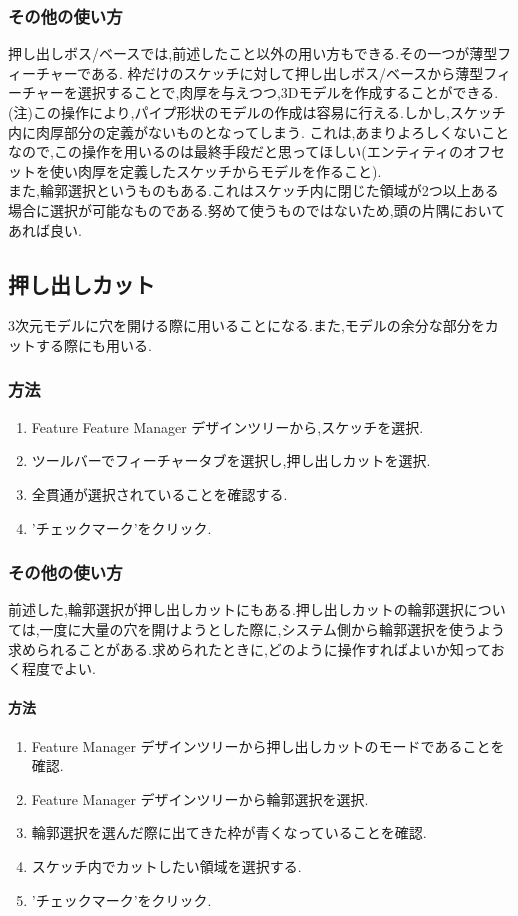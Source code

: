 \documentclass[a4paper,11pt]{jsarticle}
\begin{document}
\subsubsection{その他の使い方}
押し出しボス/ベースでは,前述したこと以外の用い方もできる.その一つが薄型フィーチャーである.
枠だけのスケッチに対して押し出しボス/ベースから薄型フィーチャーを選択することで,肉厚を与えつつ,3Dモデルを作成することができる.\\
(注)この操作により,パイプ形状のモデルの作成は容易に行える.しかし,スケッチ内に肉厚部分の定義がないものとなってしまう.
これは,あまりよろしくないことなので,この操作を用いるのは最終手段だと思ってほしい(エンティティのオフセットを使い肉厚を定義したスケッチからモデルを作ること).\\
また,輪郭選択というものもある.これはスケッチ内に閉じた領域が2つ以上ある場合に選択が可能なものである.努めて使うものではないため,頭の片隅においてあれば良い.
\subsection{押し出しカット}
3次元モデルに穴を開ける際に用いることになる.また,モデルの余分な部分をカットする際にも用いる.
\subsubsection{方法}
\begin{enumerate}
 \item Feature Feature Manager デザインツリーから,スケッチを選択.
 \item ツールバーでフィーチャータブを選択し,押し出しカットを選択.
 \item 全貫通が選択されていることを確認する.
 \item 'チェックマーク'をクリック.
\end{enumerate}
\subsubsection{その他の使い方}
前述した,輪郭選択が押し出しカットにもある.押し出しカットの輪郭選択については,一度に大量の穴を開けようとした際に,システム側から輪郭選択を使うよう求められることがある.求められたときに,どのように操作すればよいか知っておく程度でよい.
\paragraph{方法}
\begin{enumerate}
 \item Feature Manager デザインツリーから押し出しカットのモードであることを確認.
 \item Feature Manager デザインツリーから輪郭選択を選択.
 \item 輪郭選択を選んだ際に出てきた枠が青くなっていることを確認.
 \item スケッチ内でカットしたい領域を選択する.
 \item 'チェックマーク'をクリック.
\end{enumerate}
\end{document}
